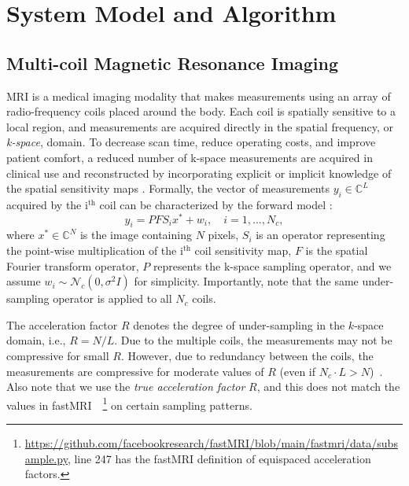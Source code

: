 \documentclass{article}
\newcommand{\C}{\mathbb{C}}
\newcommand{\nth}[1]{#1$^{\mathrm{th}}$}
\begin{document}
\section{System Model and Algorithm}

\subsection{Multi-coil Magnetic Resonance Imaging}
MRI is a medical imaging modality that makes measurements using an array of radio-frequency coils placed around the body. Each coil is spatially sensitive to a local region, and measurements are acquired directly in the spatial frequency, or \textit{k-space}, domain.
To decrease scan time, reduce operating costs, and improve patient comfort, a reduced number of k-space measurements are acquired in clinical use and reconstructed by incorporating explicit or implicit knowledge of the spatial sensitivity maps \cite{sodickson1997simultaneous,pruessmann1999sense,griswold2002grappa}. 
Formally, the vector of measurements $y_i \in \C^L$ acquired by the \nth{i} coil can be characterized by the forward model \cite{pruessmann1999sense}:
\begin{equation}
    y_i = P F S_i x^* + w_i,\quad i=1,...,N_c,
    \label{eq:mri_model}
\end{equation}
\noindent where $x^* \in \C^N$  is the image containing $N$ pixels, $S_i$ is an operator representing the point-wise multiplication of the \nth{i} coil sensitivity map, $F$ is the spatial Fourier transform operator, $P$ represents the k-space sampling operator, and we assume $w_i \sim \mathcal{N}_c\left(0, \sigma^2I\right)$ for simplicity. Importantly, note that the same under-sampling operator is applied to all $N_c$ coils. 

The acceleration factor $R$ denotes the degree of under-sampling in the $k$-space domain, i.e., $R = N / L$.  
Due to the multiple coils, the measurements may not be compressive for small $R$. However, due to redundancy between the coils, the measurements are compressive for moderate values of $R$ (even if $N_c \cdot L > N$)~\cite{huang2008software}.
Also note that we use the \emph{true acceleration factor} $R$, and this does not match the values in fastMRI~\cite{knoll2020fastmri}~\footnote{\url{https://github.com/facebookresearch/fastMRI/blob/main/fastmri/data/subsample.py}, line 247 has the fastMRI definition of equispaced acceleration factors.} on certain sampling patterns.
\end{document}

